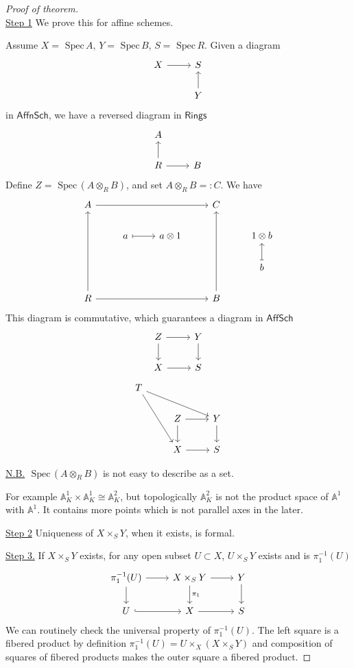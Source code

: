 \documentclass[11pt]{article}
\theoremstyle{definition}
\newcommand{\spec}{\text{ Spec}\,}
\newcommand{\affn}{\mathbb A}
\begin{document}
\begin{proof}[Proof of theorem]\ \\

\underline{Step 1} We prove this for affine schemes.

Assume $X=\spec A$, $Y=\spec B$, $S=\spec R$. Given  a diagram
$$
\begin{tikzcd}
X \arrow[r] & S \\
 & Y \arrow[u]
\end{tikzcd}
$$
in $\mathsf{AffnSch}$, we have a reversed diagram in $\mathsf{Rings}$
$$
\begin{tikzcd}
A &  \\
R \arrow[u] \arrow[r] & B
\end{tikzcd}
$$
Define $Z=\spec(A\otimes_R B)$, and set $A\otimes_R B=:C$. We have 
$$
\begin{tikzcd}
A \arrow[rrr] &  &  & C &  \\
 & a \arrow[r, maps to] & a\otimes 1 &  & 1\otimes b \\
 &  &  &  & b \arrow[u, maps to] \\
R \arrow[uuu] \arrow[rrr] &  &  & B \arrow[uuu] & 
\end{tikzcd}
$$
This diagram is commutative, which guarantees a diagram in $\mathsf{AffSch}$ 
$$
\begin{tikzcd}
Z \arrow[r] \arrow[d] & Y \arrow[d] \\
X \arrow[r] & S
\end{tikzcd}
$$
$$
\begin{tikzcd}
T \arrow[rdd] \arrow[rrd] &  &  \\
 & Z \arrow[d] \arrow[r] & Y \arrow[d] \\
 & X \arrow[r] & S
\end{tikzcd}
$$

\underline{N.B.} $\spec (A\otimes_R B)$ is not easy to describe as a set.

For example $\affn^1_K\times \affn^1_K\cong \affn^2_K$, but topologically $\affn^2_K$ is not the product space of $\affn^1$ with $\affn^1$. It contains more points which is not parallel axes in the later.

\underline{Step 2} Uniqueness of $X\times_S Y$, when it  exists, is formal.

\underline{Step 3.} If $X\times_S Y$ exists, for any open subset $U\subset X$, $U\times_S Y$ exists and is $\pi_1^{-1}(U)$
$$
\begin{tikzcd}
\pi_1^{-1}(U) \arrow[d] \arrow[r] & X\times_S Y \arrow[d, "\pi_1"] \arrow[r] & Y \arrow[d] \\
U \arrow[r, hook] & X \arrow[r] & S
\end{tikzcd}
$$
We can routinely check the universal property of $\pi_1^{-1}(U)$. The left square is a fibered product by definition $\pi_1^{-1}(U)=U\times_X(X\times_S Y)$ and  composition of squares of fibered products makes the outer square a fibered product.


\end{proof}
\end{document}
